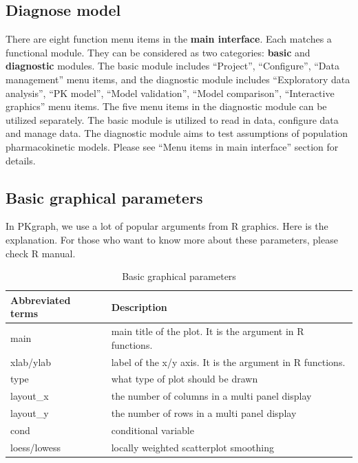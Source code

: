 \documentclass[a4paper]{article}
\begin{document}
\subsection{Diagnose model}
There are eight function menu items in the \textbf{main interface}. 
Each matches a functional module. They can be considered as two categories: 
\textbf{basic} and \textbf{diagnostic} modules. 
The basic module includes ``Project'', ``Configure'', ``Data management'' menu items, 
and the diagnostic module includes ``Exploratory data analysis'', ``PK model'', 
``Model validation'', ``Model comparison'', ``Interactive graphics'' menu items. 
The five menu items in the diagnostic module can be utilized separately.  
\newline
\newline
The basic module is utilized to read in data, configure data and manage data. The diagnostic module aims to test assumptions of population pharmacokinetic models. Please see ``Menu items in main interface'' section for details.
\subsection{Basic graphical parameters}
In PKgraph, we use a lot of popular arguments from R graphics. Here is the explanation. For those who want to know more about these parameters, please check R manual.
\begin{table}[h!tb] \centering
\begin{tabular}{l l} \hline
\textbf{ Abbreviated terms} & \textbf{Description}  \\ \hline
main & main title of the plot. It is the argument in R functions.\\
xlab/ylab & label of the x/y axis. It is the argument in R functions. \\
type & what type of plot should be drawn \\
layout\_x & the number of columns in a multi panel display \\
layout\_y & the number of rows in a multi panel display \\
cond & conditional variable \\
loess/lowess & locally weighted scatterplot smoothing \\
\hline
\end{tabular}
\caption{Basic graphical parameters}
\label{tnew_function_2}
\end{table}
\end{document}
